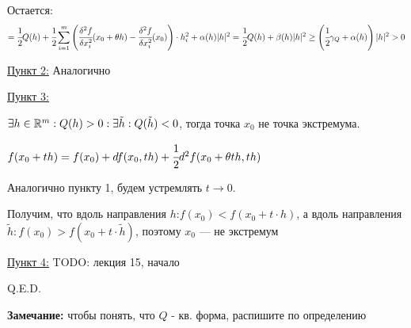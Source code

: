 Остается:
$$= \cfrac{1}{2}Q(h) + \cfrac{1}{2}\sum\limits_{i=1}^m\left (\cfrac{\delta^2f }{\delta    x_i^2}(x_0 + \theta h) - \cfrac{\delta^2 f}{\delta x_i^2}(x_0)\right)\cdot h_i^2  + \alpha(h) |h|^2 = \cfrac{1}{2}Q(h) + \beta(h)|h|^2 \geq \left(\cfrac{1}{2}\gamma_Q + \alpha(h)\right)|h|^2>0$$

\uline{Пункт 2:} Аналогично

\uline{Пункт 3:} 

$\exists h \in \mathbb{R}^m : Q(h) > 0: \exists \tilde{h}: Q(\tilde{h})<0$, тогда точка $x_0$ не точка экстремума.

$f(x_0+th) = f(x_0) + df(x_0,th) + \cfrac{1}{2}d^2f(x_0 + \theta th,th)$

Аналогично пункту 1, будем устремлять $t \rightarrow 0 $.

Получим, что вдоль направления $h$:$f(x_0) < f(x_0 + t \cdot h)$, а вдоль направления $\tilde{h}: f(x_0) > f(x_0 + t \cdot \tilde{h})$, поэтому $x_0$ --- не экстремум

\uline{Пункт 4:} TODO: лекция 15, начало

\hfill Q.E.D.

\textbf{Замечание:} чтобы понять, что $Q$ - кв. форма, распишите по определению

